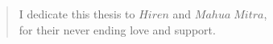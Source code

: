 \vspace*{\fill}
\vspace*{-2in}
\begin{quote}
    \center
    I dedicate this thesis to $Hiren$ and $Mahua\;Mitra$, \\
    for their never ending love and support.
\end{quote}
\vspace*{\fill}
